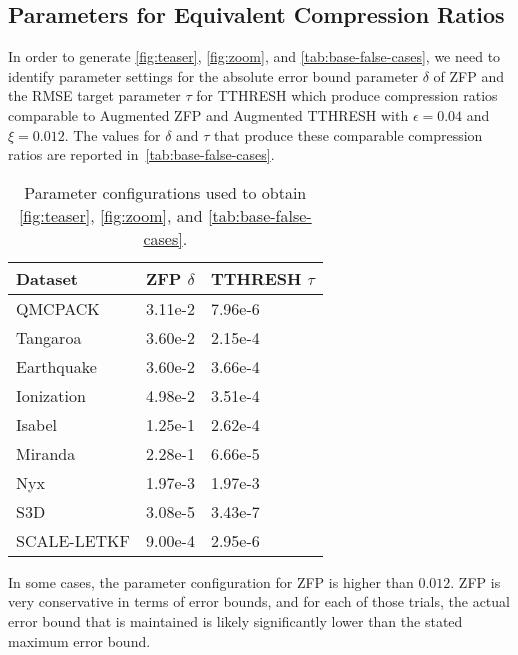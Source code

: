 \subsection{Parameters for Equivalent Compression Ratios}
\label{sec:base-parameters-equivalent}

In order to generate \cref{fig:teaser}, \cref{fig:zoom}, and \cref{tab:base-false-cases}, we need to identify parameter settings for the absolute error bound parameter $\delta$ of ZFP and the RMSE target parameter $\tau$ for TTHRESH which produce compression ratios comparable to Augmented ZFP and 
Augmented TTHRESH with $\epsilon = 0.04$ and $\xi = 0.012$. The values for $\delta$ and $\tau$ that produce these comparable compression ratios are reported in~\cref{tab:base-false-cases}.

\begin{table}[!h]
\centering
\begin{tabular}{l|ll}
\hline
Dataset    & ZFP $\delta$ & TTHRESH $\tau$ \\ \hline
QMCPACK    & 3.11e-2    & 7.96e-6        \\ \hline
Tangaroa   & 3.60e-2    & 2.15e-4        \\ \hline
Earthquake & 3.60e-2    & 3.66e-4        \\ \hline
Ionization & 4.98e-2    & 3.51e-4        \\ \hline
Isabel     & 1.25e-1    & 2.62e-4        \\ \hline
Miranda    & 2.28e-1    & 6.66e-5        \\ \hline
Nyx        & 1.97e-3    & 1.97e-3        \\ \hline
S3D        & 3.08e-5    & 3.43e-7        \\ \hline
SCALE-LETKF& 9.00e-4    & 2.95e-6        \\ \hline
\end{tabular}
\vspace{-2mm}
\caption{Parameter configurations used to obtain \cref{fig:teaser}, \cref{fig:zoom}, and \cref{tab:base-false-cases}.}
\vspace{-2mm}
\end{table}
In some cases, the parameter configuration for ZFP is higher than $0.012$. ZFP is very conservative in terms of error bounds, and for each of those trials, the actual error bound that is maintained is likely significantly lower than the stated maximum error bound.